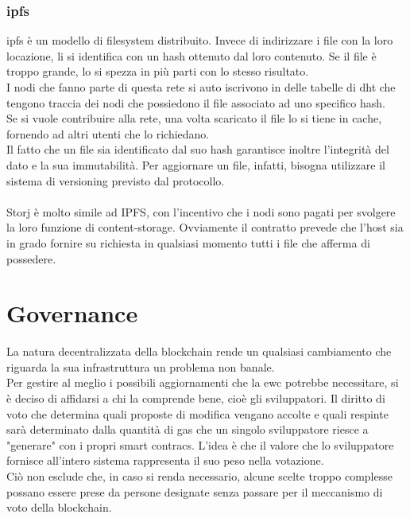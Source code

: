 \documentclass[12pt, letterpaper, twoside]{article}
\begin{document}
\subsubsection{\gls{ipfs}}
\gls{ipfs} è un modello di filesystem distribuito.
Invece di indirizzare i file con la loro locazione, li si identifica con un hash ottenuto dal loro contenuto.
Se il file è troppo grande, lo si spezza in più parti con lo stesso risultato. \\
I nodi che fanno parte di questa rete si auto iscrivono in delle tabelle di \gls{dht} che tengono traccia dei nodi che possiedono il file associato ad uno specifico hash. \\
Se si vuole contribuire alla rete, una volta scaricato il file lo si tiene in cache, fornendo ad altri utenti che lo richiedano. \\
Il fatto che un file sia identificato dal suo hash garantisce inoltre l'integrità del dato e la sua immutabilità.
Per aggiornare un file, infatti, bisogna utilizzare il sistema di versioning previsto dal protocollo. \\ \\
Storj è molto simile ad IPFS, con l'incentivo che i nodi sono pagati per svolgere la loro funzione di content-storage.
Ovviamente il contratto prevede che l'host sia in grado fornire su richiesta in qualsiasi momento tutti i file che afferma di possedere.
 
\newpage
 
\section{Governance}
La natura decentralizzata della blockchain rende un qualsiasi cambiamento che riguarda la sua infrastruttura un problema non banale. \\
Per gestire al meglio i possibili aggiornamenti che la \gls{ewc} potrebbe necessitare, si è deciso di affidarsi a chi la comprende bene, cioè gli sviluppatori.
Il diritto di voto che determina quali proposte di modifica vengano accolte e quali respinte sarà determinato dalla quantità di gas che un singolo sviluppatore riesce a "generare" con i propri smart contracs.
L'idea è che il valore che lo sviluppatore fornisce all'intero sistema rappresenta il suo peso nella votazione. \cite{wiki:ew-governance} \\
Ciò non esclude che, in caso si renda necessario, alcune scelte troppo complesse possano essere prese da persone designate senza passare per il meccanismo di voto della blockchain.
 
\end{document}
